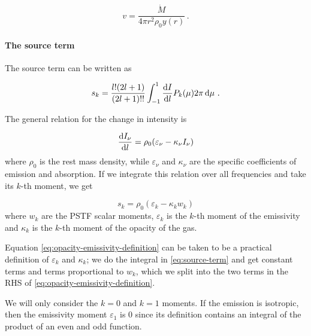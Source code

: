 \documentclass[main.tex]{subfiles}
\begin{document}
\begin{equation}
  v = \frac{\dot M}{4 \pi r^2 \rho_0 y(r)}\,.
\end{equation}

\paragraph{The source term}

The source term can be written \cite[eq. 15]{ThorneFLammmangZytkow:1981feb} as

\begin{equation} \label{eq:source-term}
  s_k = \frac{l! (2l+1)}{(2l+1)!!} \int_{-1}^1 \dv{I}{l} P_k(\mu) 2 \pi \dd{\mu}\,.
\end{equation}


The general relation for the change in intensity is

\begin{equation}
  \dv{I_\nu}{l} = \rho_0 \qty(\varepsilon_\nu - \kappa_\nu I_\nu )
\end{equation}
where \(\rho_0\) is the rest mass density, while \(\varepsilon_\nu\) and \(\kappa_\nu\) are the specific coefficients of emission and absorption. If we integrate this relation over all frequencies and take its \(k\)-th moment, we get

\begin{equation} \label{eq:opacity-emissivity-definition}
  s_k = \rho_0 (\varepsilon_k - \kappa_k w_k)
\end{equation}
where \(w_k\) are the PSTF scalar moments, \(\varepsilon_k\) is the \(k\)-th moment of the emissivity and \(\kappa_k\) is the \(k\)-th moment of the opacity of the gas.

Equation \eqref{eq:opacity-emissivity-definition} can be taken to be a practical definition of \(\varepsilon_k\) and \(\kappa_k\); we do the integral in \eqref{eq:source-term} and get constant terms and terms proportional to \(w_k\), which we split into the two terms in the RHS of \eqref{eq:opacity-emissivity-definition}.

We will only consider the \(k=0\) and \(k=1\) moments.
If the emission is isotropic, then the emissivity moment \(\varepsilon_1\) is 0 since its definition contains an integral of the product of an even and odd function.
\end{document}
